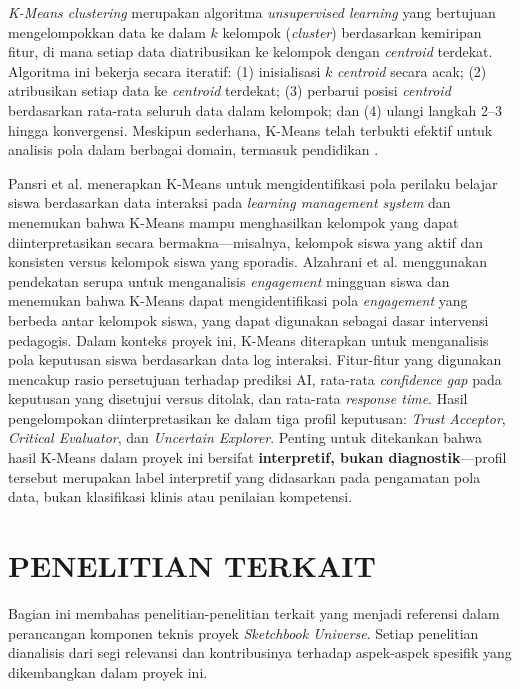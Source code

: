 \documentclass[12pt,a4paper,oneside,openany]{report}
\begin{document}
\textit{K-Means clustering} merupakan algoritma \textit{unsupervised learning} yang bertujuan mengelompokkan data ke dalam $k$ kelompok (\textit{cluster}) berdasarkan kemiripan fitur, di mana setiap data diatribusikan ke kelompok dengan \textit{centroid} terdekat. Algoritma ini bekerja secara iteratif: (1) inisialisasi $k$ \textit{centroid} secara acak; (2) atribusikan setiap data ke \textit{centroid} terdekat; (3) perbarui posisi \textit{centroid} berdasarkan rata-rata seluruh data dalam kelompok; dan (4) ulangi langkah 2--3 hingga konvergensi. Meskipun sederhana, K-Means telah terbukti efektif untuk analisis pola dalam berbagai domain, termasuk pendidikan \cite{ref10}\cite{ref11}.

Pansri et al. \cite{ref10} menerapkan K-Means untuk mengidentifikasi pola perilaku belajar siswa berdasarkan data interaksi pada \textit{learning management system} dan menemukan bahwa K-Means mampu menghasilkan kelompok yang dapat diinterpretasikan secara bermakna---misalnya, kelompok siswa yang aktif dan konsisten versus kelompok siswa yang sporadis. Alzahrani et al. \cite{ref11} menggunakan pendekatan serupa untuk menganalisis \textit{engagement} mingguan siswa dan menemukan bahwa K-Means dapat mengidentifikasi pola \textit{engagement} yang berbeda antar kelompok siswa, yang dapat digunakan sebagai dasar intervensi pedagogis. Dalam konteks proyek ini, K-Means diterapkan untuk menganalisis pola keputusan siswa berdasarkan data log interaksi. Fitur-fitur yang digunakan mencakup rasio persetujuan terhadap prediksi AI, rata-rata \textit{confidence gap} pada keputusan yang disetujui versus ditolak, dan rata-rata \textit{response time}. Hasil pengelompokan diinterpretasikan ke dalam tiga profil keputusan: \textit{Trust Acceptor}, \textit{Critical Evaluator}, dan \textit{Uncertain Explorer}. Penting untuk ditekankan bahwa hasil K-Means dalam proyek ini bersifat \textbf{interpretif, bukan diagnostik}---profil tersebut merupakan label interpretif yang didasarkan pada pengamatan pola data, bukan klasifikasi klinis atau penilaian kompetensi.

\section{PENELITIAN TERKAIT}
\label{sec:penelitian-terkait}

Bagian ini membahas penelitian-penelitian terkait yang menjadi referensi dalam perancangan komponen teknis proyek \textit{Sketchbook Universe}. Setiap penelitian dianalisis dari segi relevansi dan kontribusinya terhadap aspek-aspek spesifik yang dikembangkan dalam proyek ini.
\end{document}
